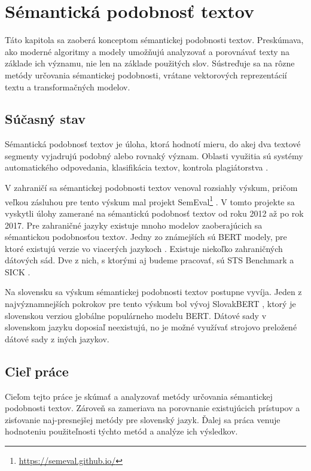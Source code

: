 \chapter{Sémantická podobnosť textov}
Táto kapitola sa zaoberá konceptom sémantickej podobnosti textov. Preskúmava, ako moderné algoritmy a modely umožňujú analyzovať a porovnávať texty na základe ich významu, nie len na základe použitých slov. Sústreďuje sa na rôzne metódy určovania sémantickej podobnosti, vrátane vektorových reprezentácií textu a transformačných modelov.
\label{kap:clenenie} 
\section{Súčasný stav}
Sémantická podobnosť textov je úloha, ktorá hodnotí mieru, do akej dva textové segmenty vyjadrujú podobný alebo rovnaký význam. Oblasti využitia sú systémy automatického odpovedania, klasifikácia textov, kontrola plagiátorstva \cite{stss}. 
\vspace{1em}

\noindent
V zahraničí sa sémantickej podobnosti textov venoval rozsiahly výskum, pričom veľkou zásluhou pre tento výskum mal projekt SemEval\footnote{\url{https://semeval.github.io/}} \cite{2015-semeval}. V tomto projekte sa vyskytli úlohy zamerané na sémantickú podobnosť textov od roku 2012 až po rok 2017. Pre zahraničné jazyky existuje mnoho modelov zaoberajúcich sa sémantickou podobnosťou textov. Jedny zo známejších sú BERT modely, pre ktoré existujú verzie vo viacerých jazykoch \cite{dutchbert, alberto, camembert}. Existuje niekoľko zahraničných dátových sád. Dve z nich, s ktorými aj budeme pracovať, sú STS Benchmark a SICK \cite{stsbenchmark1, sick}.
\vspace{1em}

\noindent
Na slovensku sa výskum sémantickej podobnosti textov postupne vyvíja. Jeden z najvýznamnejších pokrokov pre tento výskum bol vývoj SlovakBERT \cite{slovakbert_uvod2}, ktorý je slovenskou verziou globálne populárneho modelu BERT. Dátové sady v slovenskom jazyku doposiaľ neexistujú, no je možné využívať strojovo preložené dátové sady z iných jazykov.
\section{Cieľ práce}
Cieľom tejto práce je skúmať a analyzovať metódy určovania sémantickej podobnosti textov. Zároveň sa zameriava na porovnanie existujúcich prístupov a zisťovanie naj-presnejšej metódy pre slovenský jazyk. Ďalej sa práca venuje hodnoteniu použiteľnosti týchto metód a analýze ich výsledkov.
